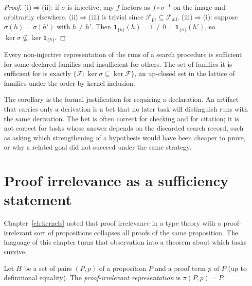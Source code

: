 \begin{proof}
(i)$\Rightarrow$(ii): if $\sigma$ is injective, any $f$ factors as $f\circ\sigma^{-1}$ on the image and arbitrarily elsewhere. (ii)$\Rightarrow$(iii) is trivial since $\mathcal F_{\mathrm{pt}}\subseteq\mathcal F_{\mathrm{all}}$. (iii)$\Rightarrow$(i): suppose $\sigma(h)=\sigma(h')$ with $h\neq h'$. Then $\mathbf 1_{\{h\}}(h)=1\neq0=\mathbf 1_{\{h\}}(h')$, so $\ker\sigma\not\subseteq\ker\mathbf 1_{\{h\}}$.
\end{proof}

\begin{corollary}
\label{cor:bet}
Every non-injective representation of the runs of a search procedure is sufficient for some declared families and insufficient for others. The set of families it is sufficient for is exactly $\{\mathcal F:\ker\sigma\subseteq\ker\mathcal F\}$, an up-closed set in the lattice of families under the order by kernel inclusion.
\end{corollary}

The corollary is the formal justification for requiring a declaration. An artifact that carries only a derivation is a bet that no later task will distinguish runs with the same derivation. The bet is often correct for checking and for citation; it is not correct for tasks whose answer depends on the discarded search record, such as asking which strengthening of a hypothesis would have been cheaper to prove, or why a related goal did not succeed under the same strategy.

\section{Proof irrelevance as a sufficiency statement}

Chapter~\ref{ch:kernels} noted that proof irrelevance in a type theory with a proof-irrelevant sort of propositions collapses all proofs of the same proposition. The language of this chapter turns that observation into a theorem about which tasks survive.

\begin{definition}
\label{def:pirrel}
Let $H$ be a set of pairs $(P,p)$ of a proposition $P$ and a proof term $p$ of $P$ (up to definitional equality). The \emph{proof-irrelevant representation} is $\pi(P,p)=P$.
\end{definition}

